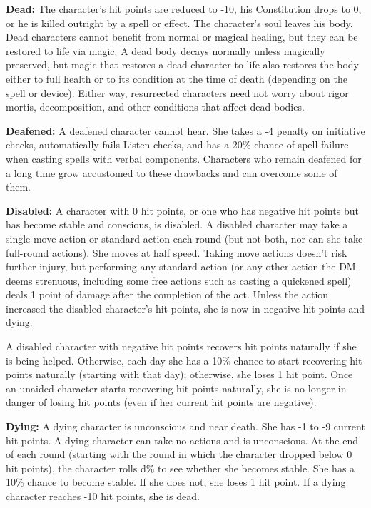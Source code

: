 \documentclass{article}
\begin{document}
\vspace{12pt}
\textbf{Dead: }The character's hit points are reduced to -10, his Constitution 
drops to 0, or he is killed outright by a spell or effect. The character's soul 
leaves his body. Dead characters cannot benefit from normal or magical healing, 
but they can be restored to life via magic. A dead body decays normally unless 
magically preserved, but magic that restores a dead character to life also restores 
the body either to full health or to its condition at the time of death (depending 
on the spell or device). Either way, resurrected characters need not worry about 
rigor mortis, decomposition, and other conditions that affect dead bodies.

\vspace{12pt}
\textbf{Deafened:} A deafened character cannot hear. She takes a -4 penalty on 
initiative checks, automatically fails Listen checks, and has a 20\% chance of 
spell failure when casting spells with verbal components. Characters who remain 
deafened for a long time grow accustomed to these drawbacks and can overcome some 
of them.

\vspace{12pt}
\textbf{Disabled:} A character with 0 hit points, or one who has negative hit points 
but has become stable and conscious, is disabled. A disabled character may take 
a single move action or standard action each round (but not both, nor can she take 
full-round actions). She moves at half speed. Taking move actions doesn't risk 
further injury, but performing any standard action (or any other action the DM 
deems strenuous, including some free actions such as casting a quickened spell) 
deals 1 point of damage after the completion of the act. Unless the action increased 
the disabled character's hit points, she is now in negative hit points and dying.

A disabled character with negative hit points recovers hit points naturally if 
she is being helped. Otherwise, each day she has a 10\% chance to start recovering 
hit points naturally (starting with that day); otherwise, she loses 1 hit point. 
Once an unaided character starts recovering hit points naturally, she is no longer 
in danger of losing hit points (even if her current hit points are negative).

\vspace{12pt}
\textbf{Dying:} A dying character is unconscious and near death. She has -1 to 
-9 current hit points. A dying character can take no actions and is unconscious. 
At the end of each round (starting with the round in which the character dropped 
below 0 hit points), the character rolls d\% to see whether she becomes stable. 
She has a 10\% chance to become stable. If she does not, she loses 1 hit point. 
If a dying character reaches -10 hit points, she is dead.
\end{document}
